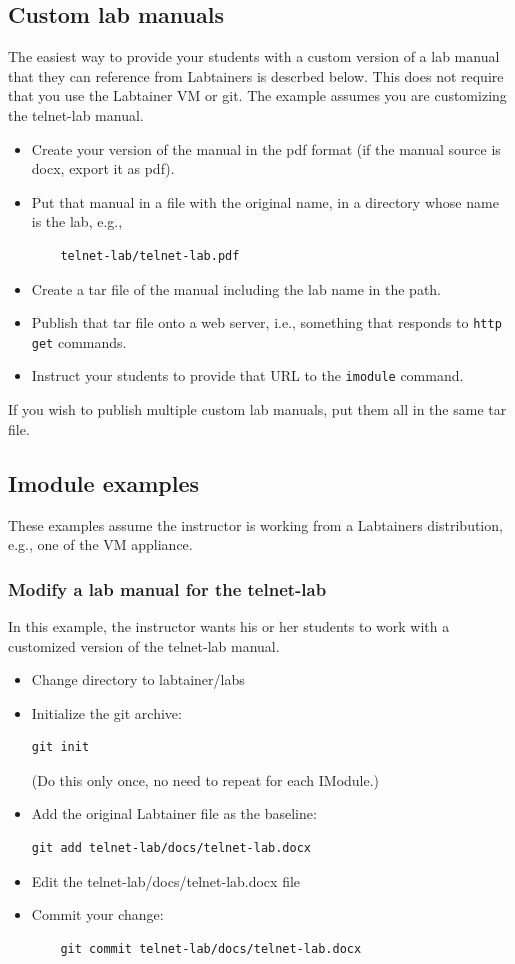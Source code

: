 \documentclass[12pt]{article}
\begin{document}
\subsection {Custom lab manuals}
The easiest way to provide your students with a custom version of a lab manual that they can reference from Labtainers
is descrbed below.  This does not require that you use the Labtainer VM or git. The example assumes you are customizing
the telnet-lab manual.
\begin{itemize}
\item Create your version of the manual in the pdf format (if the manual source is docx, export it as pdf).
\item Put that manual in a file with the original name, in a directory whose name is the lab, e.g.,
\begin{verbatim}
    telnet-lab/telnet-lab.pdf
\end{verbatim}
\item Create a tar file of the manual including the lab name in the path.
\item Publish that tar file onto a web server, i.e., something that responds to {\tt http get} commands.
\item Instruct your students to provide that URL to the {\tt imodule} command. 
\end{itemize}
If you wish to publish multiple custom lab manuals, put them all in the same tar file.
\subsection {Imodule examples}  
These examples assume the instructor is working from a Labtainers distribution, e.g., one
of the VM appliance.
\subsubsection {Modify a lab manual for the telnet-lab}
In this example, the instructor wants his or her students to work with a customized version
of the telnet-lab manual.  
\begin{itemize}
\item Change directory to labtainer/labs
\item Initialize the git archive: 
\begin{verbatim}
git init  
\end{verbatim}
\noindent (Do this only once, no need to repeat for each IModule.)
\item Add the original Labtainer file as the baseline: 

\begin{verbatim}
git add telnet-lab/docs/telnet-lab.docx
\end{verbatim}
\item Edit the telnet-lab/docs/telnet-lab.docx file
\item Commit your change: 
\begin{verbatim}
    git commit telnet-lab/docs/telnet-lab.docx
\end{verbatim}
\end{itemize}
\end{document}
